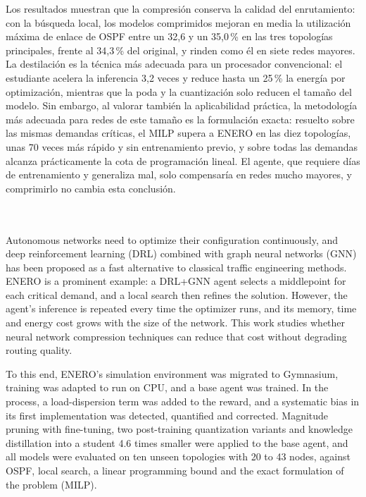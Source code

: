 Los resultados muestran que la compresión conserva la calidad del enrutamiento: con la búsqueda local, los modelos comprimidos mejoran en media la utilización máxima de enlace de OSPF entre un 32,6 y un 35,0\,\% en las tres topologías principales, frente al 34,3\,\% del original, y rinden como él en siete redes mayores. La destilación es la técnica más adecuada para un procesador convencional: el estudiante acelera la inferencia 3,2 veces y reduce hasta un 25\,\% la energía por optimización, mientras que la poda y la cuantización solo reducen el tamaño del modelo. Sin embargo, al valorar también la aplicabilidad práctica, la metodología más adecuada para redes de este tamaño es la formulación exacta: resuelto sobre las mismas demandas críticas, el MILP supera a ENERO en las diez topologías, unas 70 veces más rápido y sin entrenamiento previo, y sobre todas las demandas alcanza prácticamente la cota de programación lineal. El agente, que requiere días de entrenamiento y generaliza mal, solo compensaría en redes mucho mayores, y comprimirlo no cambia esta conclusión.

\clearpage
\thispagestyle{empty}

\\

\vspace{0.7cm}
\\

Autonomous networks need to optimize their configuration continuously, and deep reinforcement learning (DRL) combined with graph neural networks (GNN) has been proposed as a fast alternative to classical traffic engineering methods. ENERO is a prominent example: a DRL+GNN agent selects a middlepoint for each critical demand, and a local search then refines the solution. However, the agent's inference is repeated every time the optimizer runs, and its memory, time and energy cost grows with the size of the network. This work studies whether neural network compression techniques can reduce that cost without degrading routing quality.

To this end, ENERO's simulation environment was migrated to Gymnasium, training was adapted to run on CPU, and a base agent was trained. In the process, a load-dispersion term was added to the reward, and a systematic bias in its first implementation was detected, quantified and corrected. Magnitude pruning with fine-tuning, two post-training quantization variants and knowledge distillation into a student 4.6 times smaller were applied to the base agent, and all models were evaluated on ten unseen topologies with 20 to 43 nodes, against OSPF, local search, a linear programming bound and the exact formulation of the problem (MILP).

